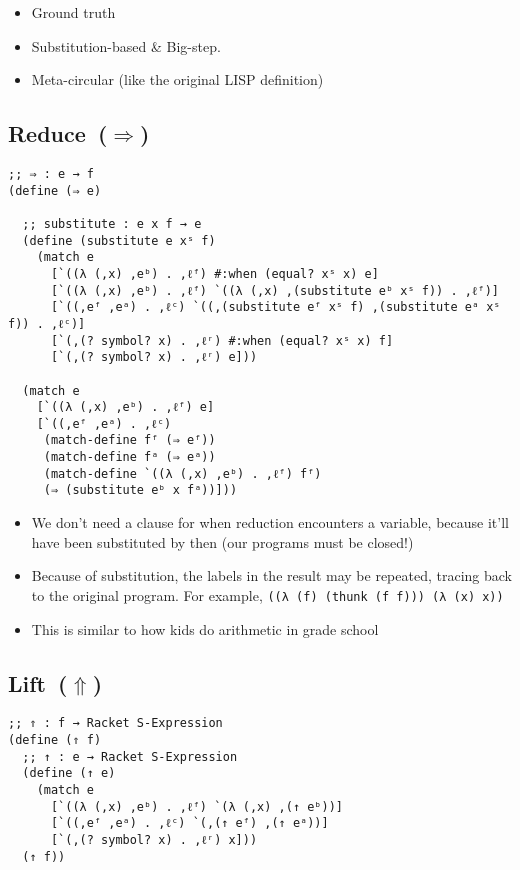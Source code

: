 \documentclass[12pt, oneside]{book}
\begin{document}
\begin{itemize}
  \item Ground truth
  \item Substitution-based \& Big-step.
  \item Meta-circular (like the original LISP definition)
\end{itemize}

\subsection{Reduce~(\(⇒\))}

\begin{Verbatim}
;; ⇒ : e → f
(define (⇒ e)

  ;; substitute : e x f → e
  (define (substitute e xˢ f)
    (match e
      [`((λ (,x) ,eᵇ) . ,ℓᶠ) #:when (equal? xˢ x) e]
      [`((λ (,x) ,eᵇ) . ,ℓᶠ) `((λ (,x) ,(substitute eᵇ xˢ f)) . ,ℓᶠ)]
      [`((,eᶠ ,eᵃ) . ,ℓᶜ) `((,(substitute eᶠ xˢ f) ,(substitute eᵃ xˢ f)) . ,ℓᶜ)]
      [`(,(? symbol? x) . ,ℓʳ) #:when (equal? xˢ x) f]
      [`(,(? symbol? x) . ,ℓʳ) e]))

  (match e
    [`((λ (,x) ,eᵇ) . ,ℓᶠ) e]
    [`((,eᶠ ,eᵃ) . ,ℓᶜ)
     (match-define fᶠ (⇒ eᶠ))
     (match-define fᵃ (⇒ eᵃ))
     (match-define `((λ (,x) ,eᵇ) . ,ℓᶠ) fᶠ)
     (⇒ (substitute eᵇ x fᵃ))]))
\end{Verbatim}

\begin{itemize}
  \item We don’t need a clause for when reduction encounters a variable, because it’ll have been substituted by then (our programs must be closed!)
  \item Because of substitution, the labels in the result may be repeated, tracing back to the original program. For example, \texttt{((λ (f) (thunk (f f))) (λ (x) x))}
  \item This is similar to how kids do arithmetic in grade school
\end{itemize}

\subsection{Lift~(\(⇑\))}

\begin{Verbatim}
;; ⇑ : f → Racket S-Expression
(define (⇑ f)
  ;; ↑ : e → Racket S-Expression
  (define (↑ e)
    (match e
      [`((λ (,x) ,eᵇ) . ,ℓᶠ) `(λ (,x) ,(↑ eᵇ))]
      [`((,eᶠ ,eᵃ) . ,ℓᶜ) `(,(↑ eᶠ) ,(↑ eᵃ))]
      [`(,(? symbol? x) . ,ℓʳ) x]))
  (↑ f))
\end{Verbatim}
\end{document}
